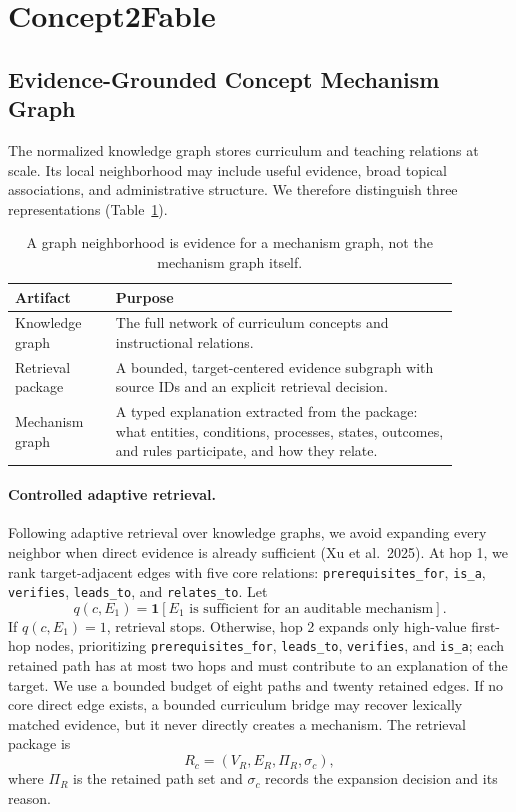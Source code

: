 \documentclass[letterpaper]{article} %
\begin{document}
\section{Concept2Fable}

\subsection{Evidence-Grounded Concept Mechanism Graph}

The normalized knowledge graph stores curriculum and teaching relations at scale. Its local neighborhood may include useful evidence, broad topical associations, and administrative structure. We therefore distinguish three representations (Table~\ref{tab:representations}).

\begin{table}[t]
\centering
\small
\begin{tabular}{p{0.20\linewidth}p{0.68\linewidth}}
\toprule
Artifact & Purpose \\
\midrule
Knowledge graph & The full network of curriculum concepts and instructional relations. \\
Retrieval package & A bounded, target-centered evidence subgraph with source IDs and an explicit retrieval decision. \\
Mechanism graph & A typed explanation extracted from the package: what entities, conditions, processes, states, outcomes, and rules participate, and how they relate. \\
\bottomrule
\end{tabular}
\caption{A graph neighborhood is evidence for a mechanism graph, not the mechanism graph itself.}
\label{tab:representations}
\end{table}

\paragraph{Controlled adaptive retrieval.}
Following adaptive retrieval over knowledge graphs, we avoid expanding every neighbor when direct evidence is already sufficient (Xu et al.~2025). At hop 1, we rank target-adjacent edges with five core relations: \texttt{prerequisites\_for}, \texttt{is\_a}, \texttt{verifies}, \texttt{leads\_to}, and \texttt{relates\_to}. Let
\[
q(c,E_1)=\mathbf{1}[E_1\text{ is sufficient for an auditable mechanism}].
\]
If $q(c,E_1)=1$, retrieval stops. Otherwise, hop 2 expands only high-value first-hop nodes, prioritizing \texttt{prerequisites\_for}, \texttt{leads\_to}, \texttt{verifies}, and \texttt{is\_a}; each retained path has at most two hops and must contribute to an explanation of the target. We use a bounded budget of eight paths and twenty retained edges. If no core direct edge exists, a bounded curriculum bridge may recover lexically matched evidence, but it never directly creates a mechanism. The retrieval package is
\[
R_c=(V_R,E_R,\Pi_R,\sigma_c),
\]
where $\Pi_R$ is the retained path set and $\sigma_c$ records the expansion decision and its reason.
\end{document}
